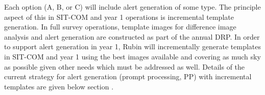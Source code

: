 Each option (A, B, or C) will include alert generation of some type. The principle aspect of this in SIT-COM and year 1 operations is incremental template generation. In full survey operations, template images for difference image analysis and alert generation are constructed as part of the annual DRP. In order to support alert generation in year 1, Rubin will incrementally generate templates in SIT-COM and year 1 using the best images available and covering as much sky as possible given other needs which must be addressed as well. Details of the current strategy for alert generation (prompt processing, PP) with incremental templates are given below section .  




